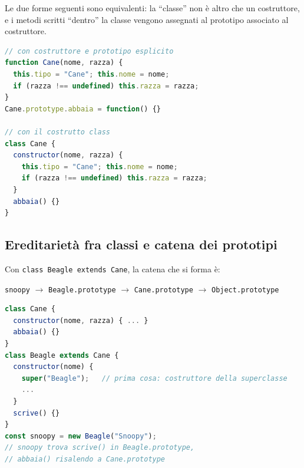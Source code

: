 \begin{esempio}
Le due forme seguenti sono equivalenti: la ``classe'' non \`e altro che un costruttore, e i
metodi scritti ``dentro'' la classe vengono assegnati al prototipo associato al costruttore.
\begin{lstlisting}[language=JavaScript]
// con costruttore e prototipo esplicito
function Cane(nome, razza) {
  this.tipo = "Cane"; this.nome = nome;
  if (razza !== undefined) this.razza = razza;
}
Cane.prototype.abbaia = function() {}

// con il costrutto class
class Cane {
  constructor(nome, razza) {
    this.tipo = "Cane"; this.nome = nome;
    if (razza !== undefined) this.razza = razza;
  }
  abbaia() {}
}
\end{lstlisting}
\end{esempio}

\subsection{Ereditariet\`a fra classi e catena dei prototipi}
Con \texttt{class Beagle extends Cane}, la catena che si forma \`e:
\begin{center}
\texttt{snoopy} $\rightarrow$ \texttt{Beagle.prototype} $\rightarrow$
\texttt{Cane.prototype} $\rightarrow$ \texttt{Object.prototype}
\end{center}
\begin{lstlisting}[language=JavaScript]
class Cane {
  constructor(nome, razza) { ... }
  abbaia() {}
}
class Beagle extends Cane {
  constructor(nome) {
    super("Beagle");   // prima cosa: costruttore della superclasse
    ...
  }
  scrive() {}
}
const snoopy = new Beagle("Snoopy");
// snoopy trova scrive() in Beagle.prototype,
// abbaia() risalendo a Cane.prototype
\end{lstlisting}
